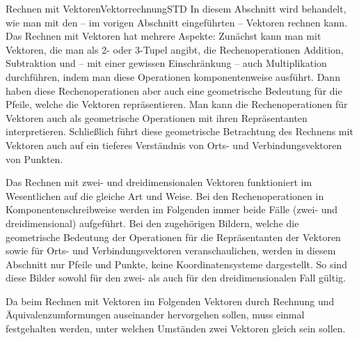 \begin{MXContent}{Rechnen mit Vektoren}{Vektorrechnung}{STD}
In diesem Abschnitt wird behandelt, wie man mit den -- im vorigen Abschnitt  eingeführten -- Vektoren rechnen kann. Das Rechnen mit Vektoren hat mehrere Aspekte: Zunächst kann man mit Vektoren, die man als 2- oder 3-Tupel angibt, die Rechenoperationen Addition, Subtraktion und -- mit einer gewissen Einschränkung -- auch Multiplikation durchführen, indem man diese Operationen komponentenweise ausführt. Dann haben diese Rechenoperationen aber auch eine geometrische Bedeutung für die Pfeile, welche die Vektoren repräsentieren. Man kann die Rechenoperationen für Vektoren auch als geometrische Operationen mit ihren Repräsentanten interpretieren. Schließlich führt diese geometrische Betrachtung des Rechnens mit Vektoren auch auf ein tieferes Verständnis von Orts- und Verbindungsvektoren von Punkten.

Das Rechnen mit zwei- und dreidimensionalen Vektoren funktioniert im Wesentlichen auf die gleiche Art und Weise. Bei den Rechenoperationen in Komponentenschreibweise werden im Folgenden immer beide Fälle (zwei- und dreidimensional) aufgeführt. Bei den zugehörigen Bildern, welche die geometrische Bedeutung der Operationen für die Repräsentanten der Vektoren sowie für Orts- und Verbindungsvektoren veranschaulichen, werden in diesem Abschnitt nur Pfeile und Punkte, keine Koordinatensysteme dargestellt. So sind diese Bilder sowohl für den zwei- als auch für den dreidimensionalen Fall gültig. 

Da beim Rechnen mit Vektoren im Folgenden Vektoren durch Rechnung und Äquivalenzumformungen auseinander hervorgehen sollen, muss einmal festgehalten werden, unter welchen Umständen zwei Vektoren gleich sein sollen. 


\end{MXContent}
